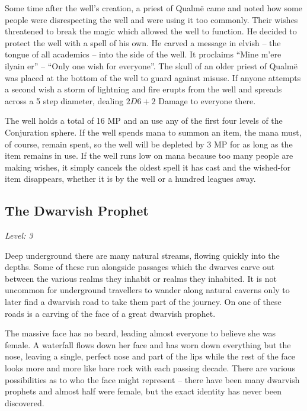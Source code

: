 \begin{multicols}{2}
Some time after the well's creation, a priest of Qualm\"{e} came and noted how some people were disrespecting the well and were using it too commonly.
Their wishes threatened to break the magic which allowed the well to function.
He decided to protect the well with a spell of his own.
He carved a message in elvish -- the tongue of all academics -- into the side of the well.
It proclaims ``Mine m'{e}re ilyain er'' -- ``Only one wish for everyone''.
The skull of an older priest of Qualm\"{e} was placed at the bottom of the well to guard against misuse.
If anyone attempts a second wish a storm of lightning and fire erupts from the well and spreads across a 5 step diameter, dealing $2D6+2$ Damage to everyone there.

The well holds a total of 16 MP and an use any of the first four levels of the Conjuration sphere.
If the well spends mana to summon an item, the mana must, of course, remain spent, so the well will be depleted by 3 MP for as long as the item remains in use.
If the well runs low on mana because too many people are making wishes, it simply cancels the oldest spell it has cast and the wished-for item disappears, whether it is by the well or a hundred leagues away.

\subsection{The Dwarvish Prophet}

\textit{Level: 3}

\noindent Deep underground there are many natural streams, flowing quickly into the depths.  Some of these run alongside passages which the dwarves carve out between the various realms they inhabit or realms they inhabited.  It is not uncommon for underground travellers to wander along natural caverns only to later find a dwarvish road to take them part of the journey.  On one of these roads is a carving of the face of a great dwarvish prophet.

\begin{boxtext}

  The massive face has no beard, leading almost everyone to believe she was female.
  A waterfall flows down her face and has worn down everything but the nose, leaving a single, perfect nose and part of the lips while the rest of the face looks more and more like bare rock with each passing decade.
  There are various possibilities as to who the face might represent -- there have been many dwarvish prophets and almost half were female, but the exact identity has never been discovered.


\end{boxtext}
\end{multicols}
